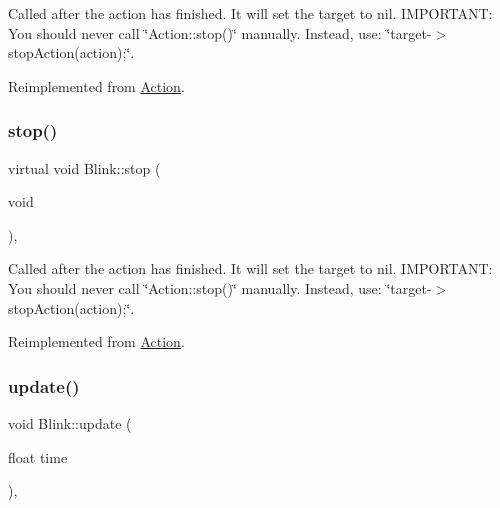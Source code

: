 Called after the action has finished. It will set the \textquotesingle{}target\textquotesingle{} to nil. I\+M\+P\+O\+R\+T\+A\+NT\+: You should never call \char`\"{}\+Action\+::stop()\char`\"{} manually. Instead, use\+: \char`\"{}target-\/$>$stop\+Action(action);\char`\"{}. 

Reimplemented from \hyperlink{classAction_a968267fa7a1dcc46a2976249a712d3c8}{Action}.

\mbox{\label{classBlink_a081f03902fb69d5b4ec0fddf0ee72b60}} 
\subsubsection{\texorpdfstring{stop()}{stop()}\hspace{0.1cm}{\footnotesize\ttfamily [2/2]}}
{\footnotesize\ttfamily virtual void Blink\+::stop (\begin{DoxyParamCaption}\item[{void}]{ }\end{DoxyParamCaption})\hspace{0.3cm}{\ttfamily [override]}, {\ttfamily [virtual]}}

Called after the action has finished. It will set the \textquotesingle{}target\textquotesingle{} to nil. I\+M\+P\+O\+R\+T\+A\+NT\+: You should never call \char`\"{}\+Action\+::stop()\char`\"{} manually. Instead, use\+: \char`\"{}target-\/$>$stop\+Action(action);\char`\"{}. 

Reimplemented from \hyperlink{classAction_a968267fa7a1dcc46a2976249a712d3c8}{Action}.

\mbox{\label{classBlink_a20ce5c25af940fe152d600a20b183f84}} 
\subsubsection{\texorpdfstring{update()}{update()}\hspace{0.1cm}{\footnotesize\ttfamily [1/2]}}
{\footnotesize\ttfamily void Blink\+::update (\begin{DoxyParamCaption}\item[{float}]{time }\end{DoxyParamCaption})\hspace{0.3cm}{\ttfamily [override]}, {\ttfamily [virtual]}}


